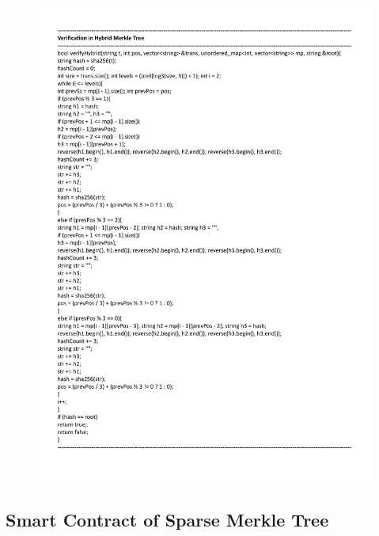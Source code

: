 \begin{figure}[H]
    \centering
    \includegraphics[scale=0.65]{figures/verify hybrid.pdf}
 
\end{figure}


\subsection{Smart Contract of Sparse Merkle Tree}

 

